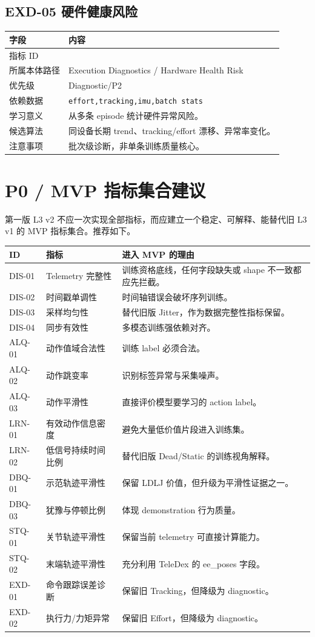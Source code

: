 \documentclass[UTF8,zihao=-4]{ctexart}
\newcommand{\Code}[1]{\texttt{#1}}
\newcommand{\MID}[1]{\texttt{\seqsplit{#1}}}
\begin{document}
\subsection{EXD-05 硬件健康风险}

\begin{longtable}{L{3.6cm} L{9.6cm}}
\toprule
字段 & 内容 \\
\midrule
指标 ID & \MID{EXD-05} \\
所属本体路径 & Execution Diagnostics / Hardware Health Risk \\
优先级 & Diagnostic/P2 \\
依赖数据 & \Code{effort,tracking,imu,batch stats} \\
学习意义 & 从多条 episode 统计硬件异常风险。 \\
候选算法 & 同设备长期 trend、tracking/effort 漂移、异常率变化。 \\
注意事项 & 批次级诊断，非单条训练质量核心。 \\
\bottomrule
\end{longtable}

\section{P0 / MVP 指标集合建议}

第一版 L3 v2 不应一次实现全部指标，而应建立一个稳定、可解释、能替代旧 L3 v1 的 MVP 指标集合。推荐如下。

\begin{longtable}{L{2.2cm} L{4.5cm} L{6.3cm}}
\toprule
ID & 指标 & 进入 MVP 的理由 \\
\midrule
DIS-01 & Telemetry 完整性 & 训练资格底线，任何字段缺失或 shape 不一致都应先拦截。 \\
DIS-02 & 时间戳单调性 & 时间轴错误会破坏序列训练。 \\
DIS-03 & 采样均匀性 & 替代旧版 Jitter，作为数据完整性指标保留。 \\
DIS-04 & 同步有效性 & 多模态训练强依赖对齐。 \\
ALQ-01 & 动作值域合法性 & 训练 label 必须合法。 \\
ALQ-02 & 动作跳变率 & 识别标签异常与采集噪声。 \\
ALQ-03 & 动作平滑性 & 直接评价模型要学习的 action label。 \\
LRN-01 & 有效动作信息密度 & 避免大量低价值片段进入训练集。 \\
LRN-02 & 低信号持续时间比例 & 替代旧版 Dead/Static 的训练视角解释。 \\
DBQ-01 & 示范轨迹平滑性 & 保留 LDLJ 价值，但升级为平滑性证据之一。 \\
DBQ-03 & 犹豫与停顿比例 & 体现 demonstration 行为质量。 \\
STQ-01 & 关节轨迹平滑性 & 保留当前 telemetry 可直接计算能力。 \\
STQ-02 & 末端轨迹平滑性 & 充分利用 TeleDex 的 ee\_poses 字段。 \\
EXD-01 & 命令跟踪误差诊断 & 保留旧 Tracking，但降级为 diagnostic。 \\
EXD-02 & 执行力/力矩异常 & 保留旧 Effort，但降级为 diagnostic。 \\
\bottomrule
\end{longtable}
\end{document}
